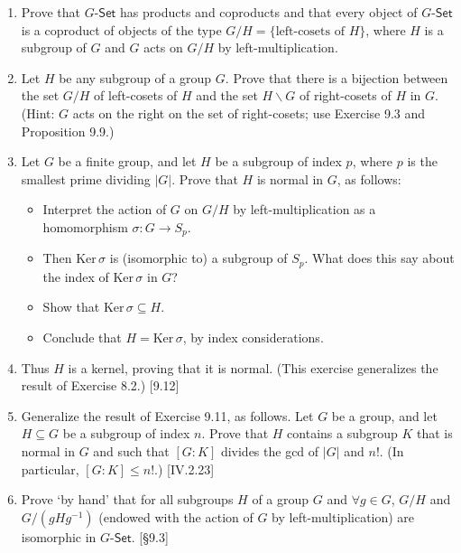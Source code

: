 \begin{enumerate}
    \item Prove that $G$-$\mathsf{Set}$ has products and coproducts and that every object of $G$-$\mathsf{Set}$ is a coproduct of objects of the type $G/H = \{\text{left-cosets of } H\}$, where $H$ is a subgroup of $G$ and $G$ acts on $G/H$ by left-multiplication.

    \item Let $H$ be any subgroup of a group $G$. Prove that there is a bijection between the set $G/H$ of left-cosets of $H$ and the set $H \backslash G$ of right-cosets of $H$ in $G$. (Hint: $G$ acts on the right on the set of right-cosets; use Exercise 9.3 and Proposition 9.9.)

    \item Let $G$ be a finite group, and let $H$ be a subgroup of index $p$, where $p$ is the smallest prime dividing $|G|$. Prove that $H$ is normal in $G$, as follows:
          \begin{itemize}
              \item Interpret the action of $G$ on $G/H$ by left-multiplication as a homomorphism $\sigma: G \to S_p$.
              \item Then $\text{Ker}\,\sigma$ is (isomorphic to) a subgroup of $S_p$. What does this say about the index of $\text{Ker}\,\sigma$ in $G$?
              \item Show that $\text{Ker}\,\sigma \subseteq H$.
              \item Conclude that $H = \text{Ker}\,\sigma$, by index considerations.
          \end{itemize}

    \item Thus $H$ is a kernel, proving that it is normal. (This exercise generalizes the result of Exercise 8.2.) [9.12]

    \item Generalize the result of Exercise 9.11, as follows. Let $G$ be a group, and let $H \subseteq G$ be a subgroup of index $n$. Prove that $H$ contains a subgroup $K$ that is normal in $G$ and such that $[G: K]$ divides the gcd of $|G|$ and $n!$. (In particular, $[G: K] \le n!$.) [IV.2.23]

    \item Prove `by hand' that for all subgroups $H$ of a group $G$ and $\forall g \in G$, $G/H$ and $G/(gHg^{-1})$ (endowed with the action of $G$ by left-multiplication) are isomorphic in $G$-$\mathsf{Set}$. [\S9.3]


\end{enumerate}

